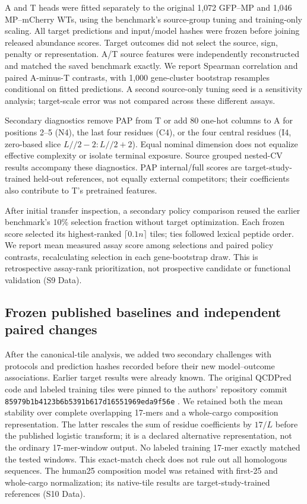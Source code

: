 \documentclass[11pt,a4paper]{article}
\begin{document}
A and T heads were fitted separately to the original 1,072 GFP--MP and
1,046 MP--mCherry WTs, using the benchmark's source-group tuning and
training-only scaling. All target predictions and input/model hashes were
frozen before joining released abundance scores. Target outcomes did not
select the source, sign, penalty or representation. A/T source features were
independently reconstructed and matched the saved benchmark exactly. We
report Spearman correlation and paired A-minus-T contrasts, with 1,000
gene-cluster bootstrap resamples conditional on fitted predictions. A second
source-only tuning seed is a sensitivity analysis; target-scale error was
not compared across these different assays.

Secondary diagnostics remove PAP from T or add 80 one-hot columns to A
for positions 2--5 (N4), the last four residues (C4), or the four central
residues (I4, zero-based slice $L//2-2:L//2+2$). Equal nominal dimension
does not equalize effective complexity or isolate terminal exposure. Source
grouped nested-CV results accompany these diagnostics. PAP internal/full
scores are target-study-trained held-out references, not equally external
competitors; their coefficients also contribute to T's pretrained features.

After initial transfer inspection, a secondary policy comparison reused the
earlier benchmark's $10\%$ selection fraction without target optimization.
Each frozen score selected its highest-ranked $\lceil0.1n\rceil$ tiles;
ties followed lexical peptide order. We report mean measured assay score
among selections and paired policy contrasts, recalculating selection in
each gene-bootstrap draw. This is retrospective assay-rank prioritization,
not prospective candidate or functional validation (S9 Data).

\subsection{Frozen published baselines and independent paired changes}
After the canonical-tile analysis, we added two secondary challenges with
protocols and prediction hashes recorded before their new model--outcome
associations. Earlier target results were already known. The original
QCDPred code and labeled training tiles were pinned to the authors' repository
commit \texttt{85979b1b4123b6b5391b617d16551969eda9f56e}
\cite{qcdpred}. We retained both the mean stability over complete overlapping
17-mers and a whole-cargo composition representation. The latter rescales
the sum of residue coefficients by $17/L$ before the published logistic
transform; it is a declared alternative representation, not the ordinary
17-mer-window output. No labeled training 17-mer exactly matched the tested
windows. This exact-match check does not rule out all homologous sequences. The human25
composition model was retained with first-25 and whole-cargo normalization;
its native-tile results are target-study-trained references (S10 Data).
\end{document}
